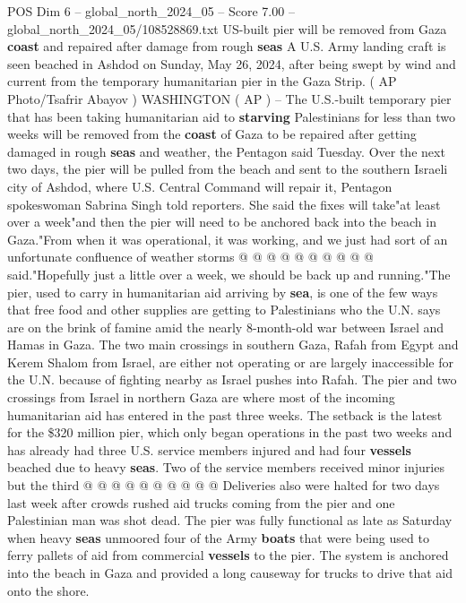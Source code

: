 \begin{textsample}{POS Dim 6 – global\_north\_2024\_05 – Score 7.00 – global\_north\_2024\_05/108528869.txt}  \label{ex:f6_pos_166}
US-built pier will be removed from Gaza \textbf{coast} and repaired after damage from rough \textbf{seas} A U.S.
Army landing craft is seen beached in Ashdod on Sunday, May 26, 2024, after being swept by wind and current from the temporary humanitarian pier in the Gaza Strip. ( AP Photo/Tsafrir Abayov ) WASHINGTON ( AP ) -- The U.S.-built temporary pier that has been taking humanitarian aid to \textbf{starving} Palestinians for less than two weeks will be removed from the \textbf{coast} of Gaza to be repaired after getting damaged in rough \textbf{seas} and weather, the Pentagon said Tuesday.
Over the next two days, the pier will be pulled from the beach and sent to the southern Israeli city of Ashdod, where U.S.
Central Command will repair it, Pentagon spokeswoman Sabrina Singh told reporters.
She said the fixes will take"at least over a week"and then the pier will need to be anchored back into the beach in Gaza."From when it was operational, it was working, and we just had sort of an unfortunate confluence of weather storms @ @ @ @ @ @ @ @ @ @ said."Hopefully just a little over a week, we should be back up and running."The pier, used to carry in humanitarian aid arriving by \textbf{sea}, is one of the few ways that free food and other supplies are getting to Palestinians who the U.N. says are on the brink of famine amid the nearly 8-month-old war between Israel and Hamas in Gaza.
The two main crossings in southern Gaza, Rafah from Egypt and Kerem Shalom from Israel, are either not operating or are largely inaccessible for the U.N. because of fighting nearby as Israel pushes into Rafah.
The pier and two crossings from Israel in northern Gaza are where most of the incoming humanitarian aid has entered in the past three weeks.
The setback is the latest for the \$320 million pier, which only began operations in the past two weeks and has already had three U.S. service members injured and had four \textbf{vessels} beached due to heavy \textbf{seas}.
Two of the service members received minor injuries but the third @ @ @ @ @ @ @ @ @ @ Deliveries also were halted for two days last week after crowds rushed aid trucks coming from the pier and one Palestinian man was shot dead.
The pier was fully functional as late as Saturday when heavy \textbf{seas} unmoored four of the Army \textbf{boats} that were being used to ferry pallets of aid from commercial \textbf{vessels} to the pier.
The system is anchored into the beach in Gaza and provided a long causeway for trucks to drive that aid onto the shore.

\end{textsample}
